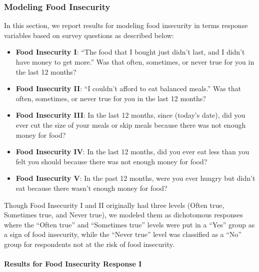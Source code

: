 \documentclass[
  10pt,
]{article}
\begin{document}
\hypertarget{modeling-food-insecurity}{%
\subsubsection{Modeling Food Insecurity}\label{modeling-food-insecurity}}

In this section, we report results for modeling food insecurity in terms response variables based on survey questions as described below:

\begin{itemize}
\item
  \textbf{Food Insecurity I}: ``The food that I bought just didn't last, and I didn't have money to get more.'' Was that often, sometimes, or never true for you in the last 12 months?
\item
  \textbf{Food Insecurity II}: ``I couldn't afford to eat balanced meals.'' Was that often, sometimes, or never true for you in the last 12 months?
\item
  \textbf{Food Insecurity III}: In the last 12 months, since (today's date), did you ever cut the size of your meals or skip meals because there was not enough money for food?
\item
  \textbf{Food Insecurity IV}: In the last 12 months, did you ever eat less than you felt you should because there was not enough money for food?
\item
  \textbf{Food Insecurity V}: In the past 12 months, were you ever hungry but didn't eat because there wasn't enough money for food?
\end{itemize}

Though Food Insecurity I and II originally had three levels (Often true, Sometimes true, and Never true), we modeled them as dichotomous responses where the ``Often true'' and ``Sometimes true'' levels were put in a ``Yes'' group as a sign of food insecurity, while the ``Never true'' level was classified as a ``No'' group for respondents not at the risk of food insecurity.

\hypertarget{results-for-food-insecurity-response-i}{%
\paragraph{Results for Food Insecurity Response I}\label{results-for-food-insecurity-response-i}}
\end{document}
